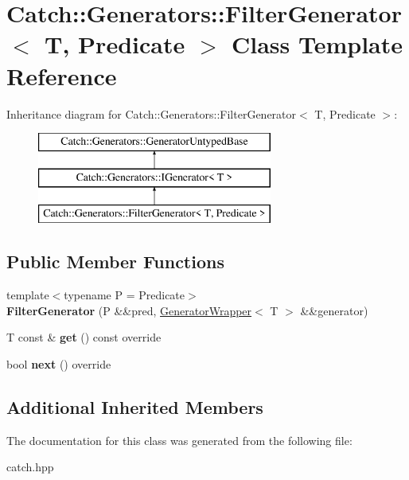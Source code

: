 \hypertarget{classCatch_1_1Generators_1_1FilterGenerator}{}\section{Catch\+::Generators\+::Filter\+Generator$<$ T, Predicate $>$ Class Template Reference}
\label{classCatch_1_1Generators_1_1FilterGenerator}
Inheritance diagram for Catch\+::Generators\+::Filter\+Generator$<$ T, Predicate $>$\+:\begin{figure}[H]
\begin{center}
\leavevmode
\includegraphics[height=3.000000cm]{classCatch_1_1Generators_1_1FilterGenerator}
\end{center}
\end{figure}
\subsection*{Public Member Functions}
\begin{DoxyCompactItemize}
\item 
\mbox{\label{classCatch_1_1Generators_1_1FilterGenerator_aa16886a5e41cbd3b6ffa3dd52388a3a1}} 
{\footnotesize template$<$typename P  = Predicate$>$ }\\{\bfseries Filter\+Generator} (P \&\&pred, \mbox{\hyperlink{classCatch_1_1Generators_1_1GeneratorWrapper}{Generator\+Wrapper}}$<$ T $>$ \&\&generator)
\item 
\mbox{\label{classCatch_1_1Generators_1_1FilterGenerator_ab30e81b61a77430661d40f814758f6fe}} 
T const  \& {\bfseries get} () const override
\item 
\mbox{\label{classCatch_1_1Generators_1_1FilterGenerator_a02ce0839dcaa7545c55d0fe70cc50e84}} 
bool {\bfseries next} () override
\end{DoxyCompactItemize}
\subsection*{Additional Inherited Members}


The documentation for this class was generated from the following file\+:\begin{DoxyCompactItemize}
\item 
catch.\+hpp\end{DoxyCompactItemize}
